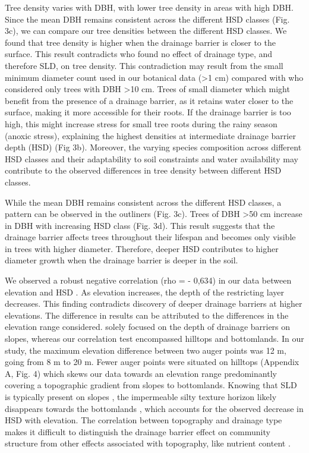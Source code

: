 \documentclass[fleqn,11pt]{latex/stylish_article} %
\begin{document}
Tree density varies with DBH, with lower tree density in areas with high DBH. Since the mean DBH remains consistent across the different HSD classes (Fig. 3c), we can compare our tree densities between the different HSD classes. We found that tree density is higher when the drainage barrier is closer to the surface. This result contradicts \citet{sabatierInfluenceSoilCover1997} who found no effect of drainage type, and therefore SLD, on tree density. This contradiction may result from the small minimum diameter count used in our botanical data (\textgreater1 cm) compared with \citet{sabatierInfluenceSoilCover1997} who considered only trees with DBH \textgreater10 cm. Trees of small diameter which might benefit from the presence of a drainage barrier, as it retains water closer to the surface, making it more accessible for their roots. If the drainage barrier is too high, this might increase stress for small tree roots during the rainy season (anoxic stress), explaining the highest densities at intermediate drainage barrier depth (HSD) (Fig 3b). Moreover, the varying species composition across different HSD classes and their adaptability to soil constraints and water availability may contribute to the observed differences in tree density between different HSD classes.

While the mean DBH remains consistent across the different HSD classes, a pattern can be observed in the outliners (Fig. 3c). Trees of DBH \textgreater50 cm increase in DBH with increasing HSD class (Fig. 3d). This result suggests that the drainage barrier affects trees throughout their lifespan and becomes only visible in trees with higher diameter. Therefore, deeper HSD contributes to higher diameter growth when the drainage barrier is deeper in the soil.

We observed a robust negative correlation (rho = - 0,634) in our data between elevation and HSD . As elevation increases, the depth of the restricting layer decreases. This finding contradicts \citet{epronSpatialVariationSoil2006} discovery of deeper drainage barriers at higher elevations. The difference in results can be attributed to the differences in the elevation range considered. \citet{epronSpatialVariationSoil2006} solely focused on the depth of drainage barriers on slopes, whereas our correlation test encompassed hilltops and bottomlands. In our study, the maximum elevation difference between two auger points was 12 m, going from 8 m to 20 m. Fewer auger points were situated on hilltops (Appendix A, Fig. 4) which skews our data towards an elevation range predominantly covering a topographic gradient from slopes to bottomlands. Knowing that SLD is typically present on slopes \citep{fanHydrologicRegulationPlant2017, pelissierWithinplotRelationshipsTree2002}, the impermeable silty texture horizon likely disappears towards the bottomlands \citep{bouletAnalyseStructuraleCartographie1982}, which accounts for the observed decrease in HSD with elevation. The correlation between topography and drainage type makes it difficult to distinguish the drainage barrier effect on community structure from other effects associated with topography, like nutrient content \citep{pegueroNutrientbasedSpeciesSelection2023, vanlangenhoveNaarEenBeter2020}.
\end{document}
